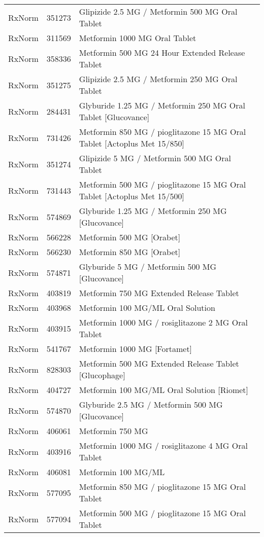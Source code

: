 \begin{longtable}{p{}p{}p{}}
  RxNorm & 351273 & Glipizide 2.5 MG / Metformin 500 MG Oral Tablet \\ 
  RxNorm & 311569 & Metformin 1000 MG Oral Tablet \\ 
  RxNorm & 358336 & Metformin 500 MG 24 Hour Extended Release Tablet \\ 
  RxNorm & 351275 & Glipizide 2.5 MG / Metformin 250 MG Oral Tablet \\ 
  RxNorm & 284431 & Glyburide 1.25 MG / Metformin 250 MG Oral Tablet [Glucovance] \\ 
  RxNorm & 731426 & Metformin 850 MG / pioglitazone 15 MG Oral Tablet [Actoplus Met 15/850] \\ 
  RxNorm & 351274 & Glipizide 5 MG / Metformin 500 MG Oral Tablet \\ 
  RxNorm & 731443 & Metformin 500 MG / pioglitazone 15 MG Oral Tablet [Actoplus Met 15/500] \\ 
  RxNorm & 574869 & Glyburide 1.25 MG / Metformin 250 MG [Glucovance] \\ 
  RxNorm & 566228 & Metformin 500 MG [Orabet] \\ 
  RxNorm & 566230 & Metformin 850 MG [Orabet] \\ 
  RxNorm & 574871 & Glyburide 5 MG / Metformin 500 MG [Glucovance] \\ 
  RxNorm & 403819 & Metformin 750 MG Extended Release Tablet \\ 
  RxNorm & 403968 & Metformin 100 MG/ML Oral Solution \\ 
  RxNorm & 403915 & Metformin 1000 MG / rosiglitazone 2 MG Oral Tablet \\ 
  RxNorm & 541767 & Metformin 1000 MG [Fortamet] \\ 
  RxNorm & 828303 & Metformin 500 MG Extended Release Tablet [Glucophage] \\ 
  RxNorm & 404727 & Metformin 100 MG/ML Oral Solution [Riomet] \\ 
  RxNorm & 574870 & Glyburide 2.5 MG / Metformin 500 MG [Glucovance] \\ 
  RxNorm & 406061 & Metformin 750 MG \\ 
  RxNorm & 403916 & Metformin 1000 MG / rosiglitazone 4 MG Oral Tablet \\ 
  RxNorm & 406081 & Metformin 100 MG/ML \\ 
  RxNorm & 577095 & Metformin 850 MG / pioglitazone 15 MG Oral Tablet \\ 
  RxNorm & 577094 & Metformin 500 MG / pioglitazone 15 MG Oral Tablet \\ 

\end{longtable}
